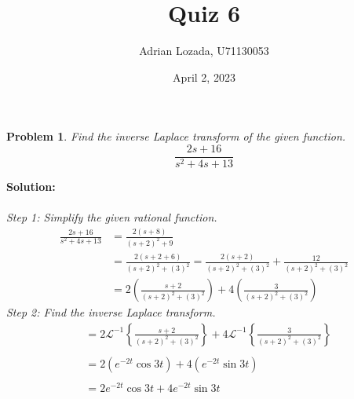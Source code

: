 \documentclass{article}
\title{Quiz 6}
\author{Adrian Lozada, U71130053}
\date{April 2, 2023}
\newtheorem{problem}{Problem}
\begin{document}
    \maketitle
    \newpage

    \begin{problem}
        Find the inverse Laplace transform of the given function.
        \[            \frac{2s + 16}{s^{2} + 4s + 13}        \]
    \end{problem}
    \textbf{Solution:} \\ \\ 
    \textit{Step 1: Simplify the given rational function.} \\
     \begin{align*}
        \frac{2s + 16}{s^{2} + 4s + 13} &= \frac{2(s + 8)}{(s + 2)^{2} + 9} \\
        &= \frac{2(s + 2 + 6)}{(s + 2)^{2} + (3)^{2}} = \frac{2(s + 2)}{(s + 2)^{2} + (3)^{2}} + \frac{12}{(s + 2)^{2} + (3)^{2}} \\
        &= 2\left( \frac{s + 2}{(s + 2)^{2} + (3)^{2}}\right) + 4\left( \frac{3}{(s + 2)^{2} + (3)^{2}}\right)
     \end{align*}
    \textit{Step 2: Find the inverse Laplace transform.} \\
    \begin{align*}
       &= 2\mathcal{L}^{-1} \left\{ \frac{s + 2}{(s + 2)^{2} + (3)^{2}}\right\} + 4\mathcal{L}^{-1} \left\{ \frac{3}{(s + 2)^{2} + (3)^{2}}\right\} \\ \\
       &= 2(e^{-2t}\cos{3t}) + 4(e^{-2t}\sin{3t}) \\ \\
       &= 2e^{-2t}\cos{3t} + 4e^{-2t}\sin{3t}
    \end{align*}
    \newpage
\end{document}
